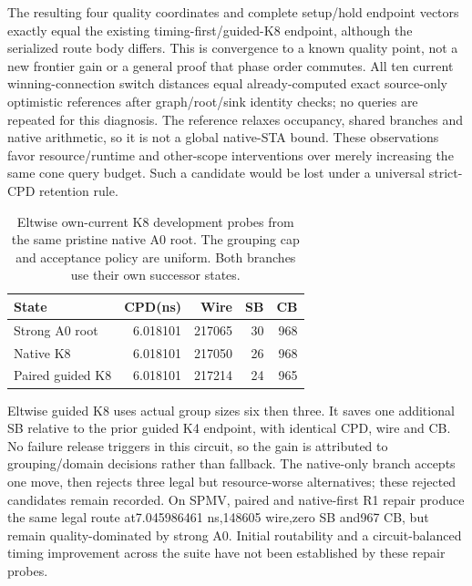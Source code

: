 \documentclass[conference,10pt]{IEEEtran}
\begin{document}
The resulting four quality coordinates and complete setup/hold endpoint vectors exactly equal the existing timing-first/guided-K8 endpoint, although the serialized route body differs. This is convergence to a known quality point, not a new frontier gain or a general proof that phase order commutes. All ten current winning-connection switch distances equal already-computed exact source-only optimistic references after graph/root/sink identity checks; no queries are repeated for this diagnosis. The reference relaxes occupancy, shared branches and native arithmetic, so it is not a global native-STA bound. These observations favor resource/runtime and other-scope interventions over merely increasing the same cone query budget. Such a candidate would be lost under a universal strict-CPD retention rule.

\begin{table}[t]
\centering\caption{Eltwise own-current K8 development probes from the same pristine native A0 root. The grouping cap and acceptance policy are uniform. Both branches use their own successor states.}
\label{tab:eltwise}
\small
\begin{tabular}{lrrrr}\hline
State & CPD(ns) & Wire & SB & CB\\\hline
Strong A0 root &6.018101&217065&30&968\\
Native K8 &6.018101&217050&26&968\\
Paired guided K8 &6.018101&217214&24&965\\\hline
\end{tabular}
\end{table}
Eltwise guided K8 uses actual group sizes six then three. It saves one additional SB relative to the prior guided K4 endpoint, with identical CPD, wire and CB. No failure release triggers in this circuit, so the gain is attributed to grouping/domain decisions rather than fallback. The native-only branch accepts one move, then rejects three legal but resource-worse alternatives; these rejected candidates remain recorded. On SPMV, paired and native-first R1 repair produce the same legal route at7.045986461 ns,148605 wire,zero SB and967 CB, but remain quality-dominated by strong A0. Initial routability and a circuit-balanced timing improvement across the suite have not been established by these repair probes.
\end{document}

